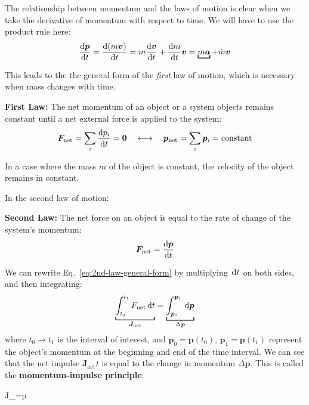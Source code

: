The relationship between momentum and the laws of motion is clear when we take
the derivative of momentum with respect to time. We will have to use the
product rule here:
\begin{equation*}
  \diff{\bm p}t = \diff{(m\bm v)}t=m\diff{\bm v}t+\diff mt\bm v
  =\underbracket[1pt]{m\bm a}+\dot{m}\bm v
\end{equation*}

This leads to the the general form of the \emph{first} law of motion, which is
necessary when mass changes with time.
\begin{definition}
  \textbf{First Law:} The net momentum of an object or a system objects remains
    constant until a net external force is applied to the system:
  \begin{equation}
    \bm F_\text{net}= \sum_i\diff{p_i}t=\bm 0
    \quad\longleftrightarrow\quad
    \bm p_\text{net}=\sum_i\bm p_i=\text{constant}
  \end{equation}
\end{definition}
In a case where the mass $m$ of the object is constant, the velocity of the
object remains in constant.

In the second law of motion:
\begin{definition}
  \textbf{Second Law:} The net force on an object is equal to the rate of
  change of the system's momentum:
  \begin{equation}
    \bm F_\text{net}=\diff{\bm p}t
    \label{eq:2nd-law-general-form}
  \end{equation}
\end{definition}
We can rewrite Eq.~\ref{eq:2nd-law-general-form} by multiplying $\dl t$ on both
sides, and then integrating:
\begin{equation}
  \underbracket[1pt]{\int_{t_0}^{t_1} F_\text{net}\dl t}_{\bm J_\text{net}} =
  \underbracket[1pt]{\int_{\bm p_0}^{\bm p_1}\dl{\bm p}}_{\Delta\bm p}
\end{equation}
where $t_0\to t_1$ is the interval of interest, and $\bm p_0=\bm p(t_0)$,
$\bm p_1=\bm p(t_1)$ represent the object's momentum at the beginning and end
of the time interval.
We can see that the net impulse $\bm J_\text{net}t$ is equal to the change in
momentum $\Delta\bm p$. This is called the \textbf{momentum-impulse principle}:
\begin{important-equation}
  \bm J_=\Delta\bm p
\end{important-equation}


